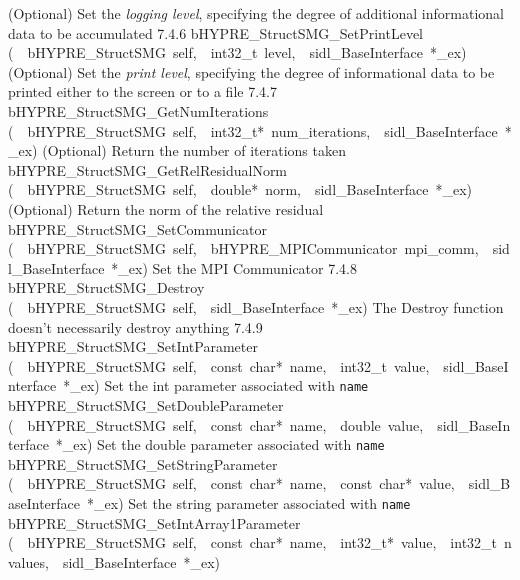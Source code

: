 \documentclass{article}
\begin{document}
\begin{cxxentry}
\begin{cxxentry}
\begin{cxxnames}
        {
(Optional) Set the {\it logging level}, specifying the degree
of additional informational data to be accumulated}
        {7.4.6}
        {bHYPRE\_StructSMG\_SetPrintLevel}
        {(\ \ bHYPRE\_StructSMG\ self,\ \ int32\_t\ level,\ \ sidl\_BaseInterface\ *\_ex)}
        {
(Optional) Set the {\it print level}, specifying the degree
of informational data to be printed either to the screen or
to a file}
        {7.4.7}
        {bHYPRE\_StructSMG\_GetNumIterations}
        {(\ \ bHYPRE\_StructSMG\ self,\ \ int32\_t*\ num\_iterations,\ \ sidl\_BaseInterface\ *\_ex)}
        {
(Optional) Return the number of iterations taken}
        {}
\label{cxx.7.4.15}
        {bHYPRE\_StructSMG\_GetRelResidualNorm}
        {(\ \ bHYPRE\_StructSMG\ self,\ \ double*\ norm,\ \ sidl\_BaseInterface\ *\_ex)}
        {
(Optional) Return the norm of the relative residual}
        {}
\label{cxx.7.4.16}
        {bHYPRE\_StructSMG\_SetCommunicator}
        {(\ \ bHYPRE\_StructSMG\ self,\ \ bHYPRE\_MPICommunicator\ mpi\_comm,\ \ sidl\_BaseInterface\ *\_ex)}
        {
Set the MPI Communicator}
        {7.4.8}
        {bHYPRE\_StructSMG\_Destroy}
        {(\ \ bHYPRE\_StructSMG\ self,\ \ sidl\_BaseInterface\ *\_ex)}
        {
The Destroy function doesn't necessarily destroy anything}
        {7.4.9}
        {bHYPRE\_StructSMG\_SetIntParameter}
        {(\ \ bHYPRE\_StructSMG\ self,\ \ const\ char*\ name,\ \ int32\_t\ value,\ \ sidl\_BaseInterface\ *\_ex)}
        {
Set the int parameter associated with {\tt name}}
        {}
\label{cxx.7.4.17}
        {bHYPRE\_StructSMG\_SetDoubleParameter}
        {(\ \ bHYPRE\_StructSMG\ self,\ \ const\ char*\ name,\ \ double\ value,\ \ sidl\_BaseInterface\ *\_ex)}
        {
Set the double parameter associated with {\tt name}}
        {}
\label{cxx.7.4.18}
        {bHYPRE\_StructSMG\_SetStringParameter}
        {(\ \ bHYPRE\_StructSMG\ self,\ \ const\ char*\ name,\ \ const\ char*\ value,\ \ sidl\_BaseInterface\ *\_ex)}
        {
Set the string parameter associated with {\tt name}}
        {}
\label{cxx.7.4.19}
        {bHYPRE\_StructSMG\_SetIntArray1Parameter}
        {(\ \ bHYPRE\_StructSMG\ self,\ \ const\ char*\ name,\ \ int32\_t*\ value,\ \ int32\_t\ nvalues,\ \ sidl\_BaseInterface\ *\_ex)}

\end{cxxnames}
\end{cxxentry}
\end{cxxentry}
\end{document}
